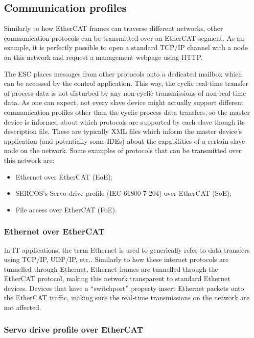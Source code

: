 \subsection{Communication profiles} \label{subsec:comm_profiles}

Similarly to how EtherCAT frames can traverse different networks, other communication protocols can be transmitted over an EtherCAT segment.
As an example, it is perfectly possible to open a standard TCP/IP channel with a node on this network and request a management webpage using HTTP.

The ESC places messages from other protocols onto a dedicated mailbox which can be accessed by the control application.
This way, the cyclic real-time transfer of process-data is not disturbed by any non-cyclic transmissions of non-real-time data.
As one can expect, not every slave device might actually support different communication profiles other than the cyclic process data transfers, so the master device is informed about which protocols are supported by each slave though its description file.
These are typically XML files which inform the master device's application (and potentially some IDEs) about the capabilities of a certain slave node on the network.
Some examples of protocols that can be transmitted over this network are:

\begin{itemize}
	\item Ethernet over EtherCAT (EoE);
	\item SERCOS's Servo drive profile (IEC 61800-7-204) over EtherCAT (SoE);
	\item File access over EtherCAT (FoE).
\end{itemize}

\subsubsection*{Ethernet over EtherCAT}

In IT applications, the term Ethernet is used to generically refer to data transfers using TCP/IP, UDP/IP, etc..
Similarly to how these internet protocols  are tunnelled through Ethernet, Ethernet frames are tunnelled through the EtherCAT protocol, making this network transparent to standard Ethernet devices.
Devices that have a ``switchport'' property insert Ethernet packets onto the EtherCAT traffic, making sure the real-time transmissions on the network are not affected.

\subsubsection*{Servo drive profile over EtherCAT}

